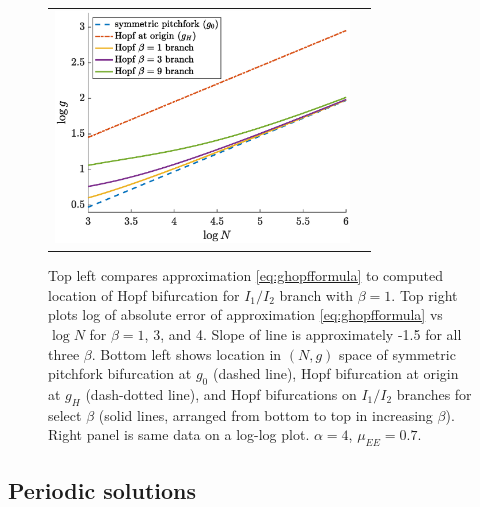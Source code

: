\documentclass[reqno]{siamonline190516}
\begin{document}
\begin{figure}
\begin{tabular}{cc}
    \includegraphics[width=7.8cm]{images/HopflogNvslogg.eps}
    \end{tabular}
    \caption{Top left compares approximation \cref{eq:ghopfformula} to computed location of Hopf bifurcation for $I_1/I_2$ branch with $\beta = 1$. Top right plots log of absolute error of approximation \cref{eq:ghopfformula} vs $\log N$ for $\beta = 1$, 3, and 4. Slope of line is approximately -1.5 for all three $\beta$. Bottom left shows location in $(N, g)$ space of symmetric pitchfork bifurcation at $g_0$ (dashed line), Hopf bifurcation at origin at $g_H$ (dash-dotted line), and Hopf bifurcations on $I_1/I_2$ branches for select $\beta$ (solid lines, arranged from bottom to top in increasing $\beta$). Right panel is same data on a log-log plot. $\alpha = 4$, $\mu_{EE}= 0.7$. }
    \label{fig:Hopfplots}
\end{figure}


\subsection{Periodic solutions}\label{sec:periodic}
\end{document}
